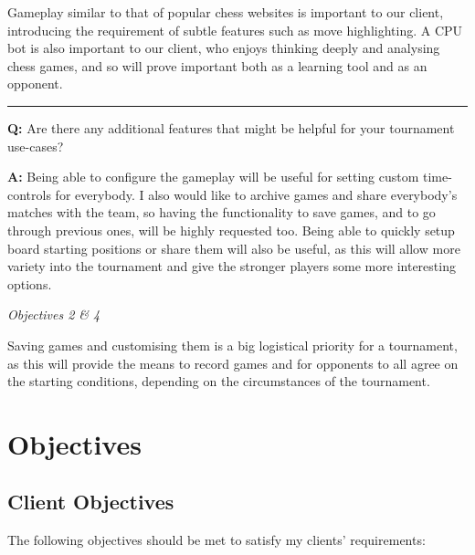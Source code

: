 \documentclass[../main/main.tex]{subfiles}
\begin{document}
\noindent Gameplay similar to that of popular chess websites is important to our client, introducing the requirement of subtle features such as move highlighting. A CPU bot is also important to our client, who enjoys thinking deeply and analysing chess games, and so will prove important both as a learning tool and as an opponent.

\noindent\rule{\textwidth}{0.4pt}

\noindent\textbf{Q:} Are there any additional features that might be helpful for your tournament use-cases?

\noindent\textbf{A:} Being able to configure the gameplay will be useful for setting custom time-controls for everybody. I also would like to archive games and share everybody’s matches with the team, so having the functionality to save games, and to go through previous ones, will be highly requested too. Being able to quickly setup board starting positions or share them will also be useful, as this will allow more variety into the tournament and give the stronger players some more interesting options.

\bigskip

\noindent\textit{Objectives 2 \& 4}

\noindent Saving games and customising them is a big logistical priority for a tournament, as this will provide the means to record games and for opponents to all agree on the starting conditions, depending on the circumstances of the tournament.

\section{Objectives}
\subsection{Client Objectives}
The following objectives should be met to satisfy my clients’ requirements:
\end{document}
